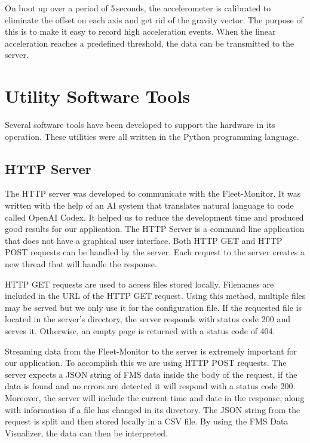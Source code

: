 On boot up over a period of 5\,seconds, the accelerometer is calibrated to eliminate the offset on each axis and get rid of the gravity vector. The purpose of this is to make it easy to record high acceleration events. When the linear acceleration reaches a predefined threshold, the data can be transmitted to the server.

\newpage
\section{Utility Software Tools}
Several software tools have been developed to support the hardware in its operation. These utilities were all written in the Python programming language. 

\subsection{HTTP Server}
The HTTP server was developed to communicate with the Fleet-Monitor. It was written with the help of an AI system that translates natural language to code called OpenAI Codex. It helped us to reduce the development time and produced good results for our application. The HTTP Server is a command line application that does not have a graphical user interface. Both HTTP GET and HTTP POST requests can be handled by the server. Each request to the server creates a new thread that will handle the response.

HTTP GET requests are used to access files stored locally. Filenames are included in the URL of the HTTP GET request. Using this method, multiple files may be served but we only use it for the configuration file. If the requested file is located in the server's directory, the server responds with status code 200 and serves it. Otherwise, an empty page is returned with a status code of 404.

Streaming data from the Fleet-Monitor to the server is extremely important for our application. To accomplish this we are using HTTP POST requests. The server expects a JSON string of FMS data inside the body of the request, if the data is found and no errors are detected it will respond with a status code 200. Moreover, the server will include the current time and date in the response, along with information if a file has changed in its directory. The JSON string from the request is split and then stored locally in a CSV file. By using the FMS Data Visualizer, the data can then be interpreted.

